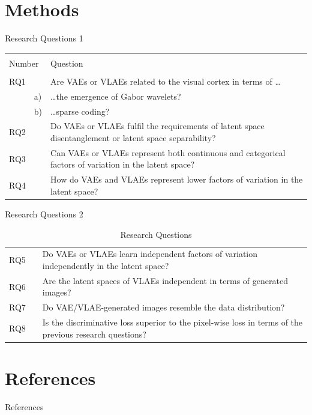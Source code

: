 \documentclass{beamer}
\begin{document}
    \section{Methods}
    \begin{frame}{Research Questions 1}
        \begin{table}[H]
            \begin{tabularx}{\textwidth}{llX}
                \toprule \\
                \multicolumn{2}{l}{Number} & Question \\
                \midrule \\
                RQ1 &    & Are VAEs or VLAEs related to the visual cortex in terms of \ldots                                      \\
                & a) & \hspace{1cm} \ldots the emergence of Gabor wavelets?                                                   \\
                & b) & \hspace{1cm} \ldots sparse coding?                                                                     \\
                RQ2 &    & Do VAEs or VLAEs fulfil the requirements of latent space disentanglement or latent space separability? \\
                RQ3 &    & Can VAEs or VLAEs represent both continuous and categorical factors of variation in the latent space?  \\
                RQ4 &    & How do VAEs and VLAEs represent lower factors of variation in the latent space?                        \\
            \end{tabularx}
        \end{table}
    \end{frame}
    \begin{frame}{Research Questions 2}
        \begin{table}[H]
            \begin{tabularx}{\textwidth}{llX}
                RQ5 & & Do VAEs or VLAEs learn independent factors of variation independently in the latent space?              \\
                RQ6 & & Are the latent spaces of VLAEs independent in terms of generated images?                                \\
                RQ7 & & Do VAE/VLAE-generated images resemble the data distribution?                                            \\
                RQ8 & & Is the discriminative loss superior to the pixel-wise loss in terms of the previous research questions? \\
                \bottomrule
            \end{tabularx}
            \caption{Research Questions}
        \end{table}
    \end{frame}
    \section*{References}
    \begin{frame}[allowframebreaks]{References}
        \printbibliography
    \end{frame}
\end{document}

